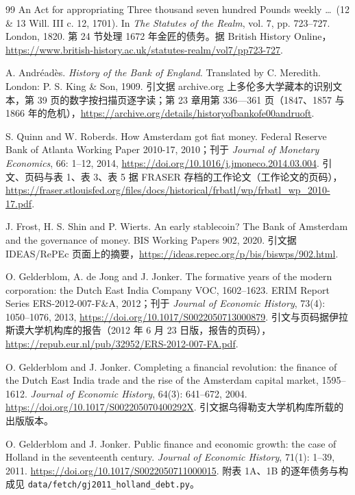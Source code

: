 \begin{thebibliography}{99}
 An Act for appropriating Three thousand seven hundred Pounds weekly \ldots\ (12 \& 13 Will. III c. 12, 1701). In \emph{The Statutes of the Realm}, vol. 7, pp. 723--727. London, 1820. 第 24 节处理 1672 年金匠的债务。据 British History Online，\url{https://www.british-history.ac.uk/statutes-realm/vol7/pp723-727}.

 A. Andréadès. \emph{History of the Bank of England}. Translated by C. Meredith. London: P. S. King \& Son, 1909. 引文据 archive.org 上多伦多大学藏本的识别文本，第 39 页的数字按扫描页逐字读；第 23 章用第 336—361 页（1847、1857 与 1866 年的危机），\url{https://archive.org/details/historyofbankofe00andruoft}.

 S. Quinn and W. Roberds. How Amsterdam got fiat money. Federal Reserve Bank of Atlanta Working Paper 2010-17, 2010；刊于 \emph{Journal of Monetary Economics}, 66: 1--12, 2014, \url{https://doi.org/10.1016/j.jmoneco.2014.03.004}. 引文、页码与表 1、表 3、表 5 据 FRASER 存档的工作论文（工作论文的页码），\url{https://fraser.stlouisfed.org/files/docs/historical/frbatl/wp/frbatl_wp_2010-17.pdf}.

 J. Frost, H. S. Shin and P. Wierts. An early stablecoin? The Bank of Amsterdam and the governance of money. BIS Working Papers 902, 2020. 引文据 IDEAS/RePEc 页面上的摘要，\url{https://ideas.repec.org/p/bis/biswps/902.html}.

 O. Gelderblom, A. de Jong and J. Jonker. The formative years of the modern corporation: the Dutch East India Company VOC, 1602--1623. ERIM Report Series ERS-2012-007-F\&A, 2012；刊于 \emph{Journal of Economic History}, 73(4): 1050--1076, 2013, \url{https://doi.org/10.1017/S0022050713000879}. 引文与页码据伊拉斯谟大学机构库的报告（2012 年 6 月 23 日版，报告的页码），\url{https://repub.eur.nl/pub/32952/ERS-2012-007-FA.pdf}.

 O. Gelderblom and J. Jonker. Completing a financial revolution: the finance of the Dutch East India trade and the rise of the Amsterdam capital market, 1595--1612. \emph{Journal of Economic History}, 64(3): 641--672, 2004. \url{https://doi.org/10.1017/S002205070400292X}. 引文据乌得勒支大学机构库所载的出版版本。

 O. Gelderblom and J. Jonker. Public finance and economic growth: the case of Holland in the seventeenth century. \emph{Journal of Economic History}, 71(1): 1--39, 2011. \url{https://doi.org/10.1017/S0022050711000015}. 附表 1A、1B 的逐年债务与构成见 \texttt{data/fetch/gj2011\_holland\_debt.py}。


\end{thebibliography}
